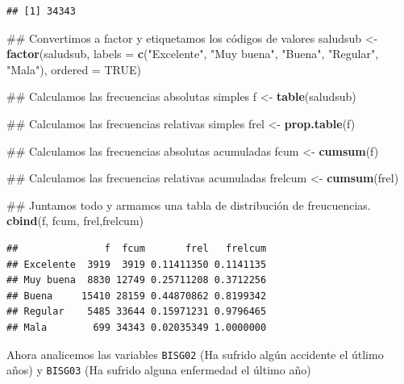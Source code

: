 \documentclass[spanish,]{book}
\newenvironment{Shaded}{\begin{snugshade}}{\end{snugshade}}
\newcommand{\KeywordTok}[1]{\textcolor[rgb]{0.13,0.29,0.53}{\textbf{#1}}}
\newcommand{\DataTypeTok}[1]{\textcolor[rgb]{0.13,0.29,0.53}{#1}}
\newcommand{\StringTok}[1]{\textcolor[rgb]{0.31,0.60,0.02}{#1}}
\newcommand{\OtherTok}[1]{\textcolor[rgb]{0.56,0.35,0.01}{#1}}
\newcommand{\NormalTok}[1]{#1}
\begin{document}
\begin{verbatim}
## [1] 34343
\end{verbatim}

\begin{Shaded}
\begin{Highlighting}[]
\NormalTok{## Convertimos a factor y etiquetamos los códigos de valores}
\NormalTok{saludsub <-}\StringTok{ }\KeywordTok{factor}\NormalTok{(saludsub,}
                   \DataTypeTok{labels =} \KeywordTok{c}\NormalTok{(}\StringTok{"Excelente"}\NormalTok{, }\StringTok{"Muy buena"}\NormalTok{, }\StringTok{"Buena"}\NormalTok{, }\StringTok{"Regular"}\NormalTok{, }\StringTok{"Mala"}\NormalTok{),}
                   \DataTypeTok{ordered =} \OtherTok{TRUE}\NormalTok{)}

\NormalTok{## Calculamos las frecuencias absolutas simples}
\NormalTok{f <-}\StringTok{ }\KeywordTok{table}\NormalTok{(saludsub)}

\NormalTok{## Calculamos las frecuencias relativas simples}
\NormalTok{frel <-}\StringTok{ }\KeywordTok{prop.table}\NormalTok{(f)}

\NormalTok{## Calculamos las frecuencias absolutas acumuladas}
\NormalTok{fcum <-}\StringTok{ }\KeywordTok{cumsum}\NormalTok{(f)}

\NormalTok{## Calculamos las frecuencias relativas acumuladas}
\NormalTok{frelcum <-}\StringTok{ }\KeywordTok{cumsum}\NormalTok{(frel)}

\NormalTok{## Juntamos todo y armamos una tabla de distribución de freucuencias.}
\KeywordTok{cbind}\NormalTok{(f, fcum, frel,frelcum)}
\end{Highlighting}
\end{Shaded}

\begin{verbatim}
##               f  fcum       frel   frelcum
## Excelente  3919  3919 0.11411350 0.1141135
## Muy buena  8830 12749 0.25711208 0.3712256
## Buena     15410 28159 0.44870862 0.8199342
## Regular    5485 33644 0.15971231 0.9796465
## Mala        699 34343 0.02035349 1.0000000
\end{verbatim}

Ahora analicemos las variables \texttt{BISG02} (Ha sufrido algún
accidente el útlimo años) y \texttt{BISG03} (Ha sufrido alguna
enfermedad el último año)
\end{document}
